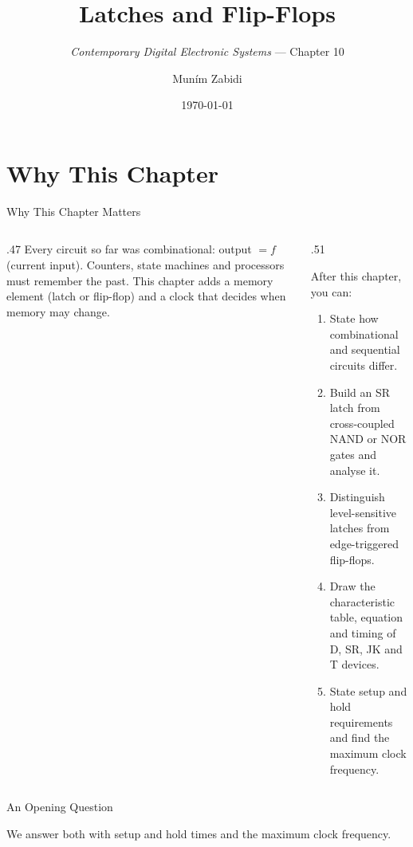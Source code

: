 \documentclass[9pt,aspectratio=169,xcolor=table]{beamer}
\title{Latches and Flip-Flops}
\subtitle{\emph{Contemporary Digital Electronic Systems} --- Chapter 10}
\author{Mun\'{i}m Zabidi}
\institute{\color{primary}Faculty of Electrical Engineering, Universiti Teknologi Malaysia}
\date{\today}
\begin{document}
\titlepage

\section{Why This Chapter}

\begin{frame}{Why This Chapter Matters}
  \begin{columns}[c]
  \begin{column}{.47\textwidth}
    Every circuit so far was combinational: output $= f$(current input). Counters, state machines and processors must \alert{remember} the past. This chapter adds a \alert{memory element} (latch or flip-flop) and a \alert{clock} that decides when memory may change.
  \end{column}
  \begin{column}{.51\textwidth}
    \begin{block}{After this chapter, you can:}
    {\small
    \begin{enumerate}\itemsep2pt
      \item State how combinational and sequential circuits differ.
      \item Build an SR latch from cross-coupled NAND or NOR gates and analyse it.
      \item Distinguish level-sensitive latches from edge-triggered flip-flops.
      \item Draw the characteristic table, equation and timing of D, SR, JK and T devices.
      \item State setup and hold requirements and find the maximum clock frequency.
    \end{enumerate}}
    \end{block}
  \end{column}
  \end{columns}
\end{frame}

\begin{frame}{An Opening Question}
  \leavevmode\vspace{4mm}
  \begin{center}
  \end{center}
  \vspace{4mm}
  We answer both with setup and hold times and the maximum clock frequency.
\end{frame}
\end{document}
